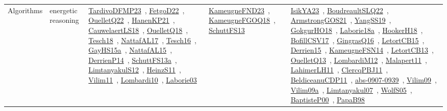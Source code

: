 {\begin{longtable}{lp{3cm}>{\raggedright\arraybackslash}p{6cm}>{\raggedright\arraybackslash}p{6cm}>{\raggedright\arraybackslash}p{8cm}}
Algorithms & energetic reasoning & \href{works/TardivoDFMP23.pdf}{TardivoDFMP23}~\cite{TardivoDFMP23}, \href{works/FetgoD22.pdf}{FetgoD22}~\cite{FetgoD22}, \href{works/OuelletQ22.pdf}{OuelletQ22}~\cite{OuelletQ22}, \href{works/HanenKP21.pdf}{HanenKP21}~\cite{HanenKP21}, \href{works/CauwelaertLS18.pdf}{CauwelaertLS18}~\cite{CauwelaertLS18}, \href{works/OuelletQ18.pdf}{OuelletQ18}~\cite{OuelletQ18}, \href{works/Tesch18.pdf}{Tesch18}~\cite{Tesch18}, \href{works/NattafAL17.pdf}{NattafAL17}~\cite{NattafAL17}, \href{works/Tesch16.pdf}{Tesch16}~\cite{Tesch16}, \href{works/GayHS15a.pdf}{GayHS15a}~\cite{GayHS15a}, \href{works/NattafAL15.pdf}{NattafAL15}~\cite{NattafAL15}, \href{works/DerrienP14.pdf}{DerrienP14}~\cite{DerrienP14}, \href{works/SchuttFS13a.pdf}{SchuttFS13a}~\cite{SchuttFS13a}, \href{works/LimtanyakulS12.pdf}{LimtanyakulS12}~\cite{LimtanyakulS12}, \href{works/HeinzS11.pdf}{HeinzS11}~\cite{HeinzS11}, \href{works/Vilim11.pdf}{Vilim11}~\cite{Vilim11}, \href{works/Lombardi10.pdf}{Lombardi10}~\cite{Lombardi10}, \href{works/Laborie03.pdf}{Laborie03}~\cite{Laborie03} & \href{works/KameugneFND23.pdf}{KameugneFND23}~\cite{KameugneFND23}, \href{works/KameugneFGOQ18.pdf}{KameugneFGOQ18}~\cite{KameugneFGOQ18}, \href{works/SchuttFS13.pdf}{SchuttFS13}~\cite{SchuttFS13} & \href{works/IsikYA23.pdf}{IsikYA23}~\cite{IsikYA23}, \href{works/BoudreaultSLQ22.pdf}{BoudreaultSLQ22}~\cite{BoudreaultSLQ22}, \href{works/ArmstrongGOS21.pdf}{ArmstrongGOS21}~\cite{ArmstrongGOS21}, \href{works/YangSS19.pdf}{YangSS19}~\cite{YangSS19}, \href{works/GokgurHO18.pdf}{GokgurHO18}~\cite{GokgurHO18}, \href{works/Laborie18a.pdf}{Laborie18a}~\cite{Laborie18a}, \href{works/HookerH18.pdf}{HookerH18}~\cite{HookerH18}, \href{works/BofillCSV17.pdf}{BofillCSV17}~\cite{BofillCSV17}, \href{works/GingrasQ16.pdf}{GingrasQ16}~\cite{GingrasQ16}, \href{works/LetortCB15.pdf}{LetortCB15}~\cite{LetortCB15}, \href{works/Derrien15.pdf}{Derrien15}~\cite{Derrien15}, \href{works/KameugneFSN14.pdf}{KameugneFSN14}~\cite{KameugneFSN14}, \href{works/LetortCB13.pdf}{LetortCB13}~\cite{LetortCB13}, \href{works/OuelletQ13.pdf}{OuelletQ13}~\cite{OuelletQ13}, \href{works/LombardiM12.pdf}{LombardiM12}~\cite{LombardiM12}, \href{works/Malapert11.pdf}{Malapert11}~\cite{Malapert11}, \href{works/LahimerLH11.pdf}{LahimerLH11}~\cite{LahimerLH11}, \href{works/ClercqPBJ11.pdf}{ClercqPBJ11}~\cite{ClercqPBJ11}, \href{works/BeldiceanuCDP11.pdf}{BeldiceanuCDP11}~\cite{BeldiceanuCDP11}, \href{works/abs-0907-0939.pdf}{abs-0907-0939}~\cite{abs-0907-0939}, \href{works/Vilim09.pdf}{Vilim09}~\cite{Vilim09}, \href{works/Vilim09a.pdf}{Vilim09a}~\cite{Vilim09a}, \href{works/Limtanyakul07.pdf}{Limtanyakul07}~\cite{Limtanyakul07}, \href{works/WolfS05.pdf}{WolfS05}~\cite{WolfS05}, \href{works/BaptisteP00.pdf}{BaptisteP00}~\cite{BaptisteP00}, \href{works/PapaB98.pdf}{PapaB98}~\cite{PapaB98}\\

\end{longtable}}
